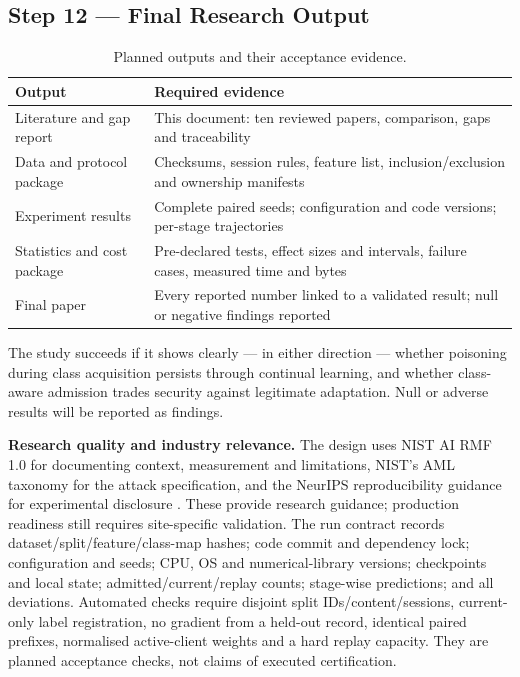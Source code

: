 \documentclass[10pt,a4paper]{article}
\begin{document}
\subsection{Step 12 --- Final Research Output}
\begin{table}[H]
\centering\footnotesize
\caption{Planned outputs and their acceptance evidence.}
\label{tab:artifacts}
\begin{tabularx}{\linewidth}{L{3.4cm}Y}
\toprule
Output & Required evidence\\
\midrule
Literature and gap report & This document: ten reviewed papers, comparison, gaps and traceability\\
Data and protocol package & Checksums, session rules, feature list, inclusion/exclusion and ownership manifests\\
Experiment results & Complete paired seeds; configuration and code versions; per-stage trajectories\\
Statistics and cost package & Pre-declared tests, effect sizes and intervals, failure cases, measured time and bytes\\
Final paper & Every reported number linked to a validated result; null or negative findings reported\\
\bottomrule
\end{tabularx}
\end{table}
The study succeeds if it shows clearly --- in either direction --- whether poisoning during class acquisition persists through continual learning, and whether class-aware admission trades security against legitimate adaptation. Null or adverse results will be reported as findings.

\textbf{Research quality and industry relevance.} The design uses NIST AI RMF 1.0 for documenting context, measurement and limitations, NIST's AML taxonomy for the attack specification, and the NeurIPS reproducibility guidance for experimental disclosure \cite{airmf,aml,checklist}. These provide research guidance; production readiness still requires site-specific validation. The run contract records dataset/split/feature/class-map hashes; code commit and dependency lock; configuration and seeds; CPU, OS and numerical-library versions; checkpoints and local state; admitted/current/replay counts; stage-wise predictions; and all deviations. Automated checks require disjoint split IDs/content/sessions, current-only label registration, no gradient from a held-out record, identical paired prefixes, normalised active-client weights and a hard replay capacity. They are planned acceptance checks, not claims of executed certification.
\end{document}
